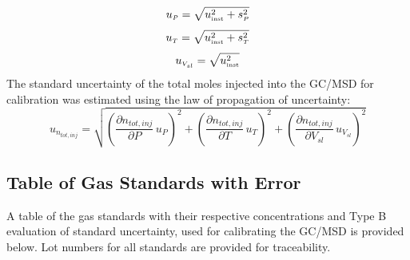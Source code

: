 \documentclass[12pt]{article}
\begin{document}
\begin{equation}
\label{eq:pressure_uncertainty}
u_{\scriptscriptstyle P} = \sqrt{ u_{\rm \scriptscriptstyle inst}^2 + s_{\scriptscriptstyle P}^2}
\end{equation}
\begin{equation}
\label{eq:temp_uncertainty}
u_{\scriptscriptstyle T} = \sqrt{ u_{\rm \scriptscriptstyle inst}^2 + s_{\scriptscriptstyle T}^2}
\end{equation}
\begin{equation}
\label{eq:volume_uncertainty}
u_{\scriptscriptstyle V_{sl}} =\sqrt{ u_{\rm \scriptscriptstyle inst}^2}
\end{equation}
The standard uncertainty of the total moles injected into the GC/MSD for calibration was estimated using the law of propagation of uncertainty:
\begin{equation}
\label{eq:moles_injected_uncertainty}
u_{\scriptscriptstyle n_{tot,inj}} = \sqrt{{\left( \frac{\partial n_{tot,inj}}{\partial P}\,u_{\scriptscriptstyle P} \right) }^2+{\left(\frac{\partial n_{tot,inj}}{\partial T}\,u_{\scriptscriptstyle T}\right)}^2+{\left(\frac{\partial n_{tot,inj}}{\partial V_{sl}}\,u_{\scriptscriptstyle V_{sl}}\right)}^2}
\end{equation}

\pagebreak
\subsection{Table of Gas Standards with Error}
\label{sssec:Table of Gas Standards with Error}
A table of the gas standards with their respective concentrations and Type B evaluation of standard uncertainty, used for calibrating the GC/MSD is provided below. Lot numbers for all standards are provided for traceability.
\end{document}
